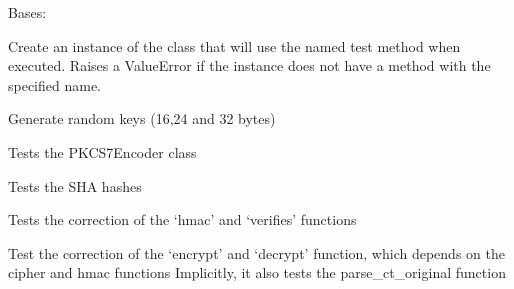 \documentclass[letterpaper,10pt,english]{sphinxmanual}
\begin{document}

\begin{fulllineitems}
\label{restaurants:restaurants.tests.TestClass}
Bases: 

Create an instance of the class that will use the named test
method when executed. Raises a ValueError if the instance does
not have a method with the specified name.

\begin{fulllineitems}
\label{restaurants:restaurants.tests.TestClass.setUp}
Generate random keys (16,24 and 32 bytes)

\end{fulllineitems}


\begin{fulllineitems}
\label{restaurants:restaurants.tests.TestClass.testEncoding}
Tests the PKCS7Encoder class

\end{fulllineitems}


\begin{fulllineitems}
\label{restaurants:restaurants.tests.TestClass.testSHA}
Tests the SHA hashes

\end{fulllineitems}


\begin{fulllineitems}
\label{restaurants:restaurants.tests.TestClass.testHmac}
Tests the correction of the `hmac' and `verifies' functions

\end{fulllineitems}


\begin{fulllineitems}
\label{restaurants:restaurants.tests.TestClass.testEncryptCorrection}
Test the correction of the `encrypt' and `decrypt' function, which depends on the cipher and hmac functions
Implicitly, it also tests the parse\_ct\_original function

\end{fulllineitems}


\end{fulllineitems}
\end{document}
